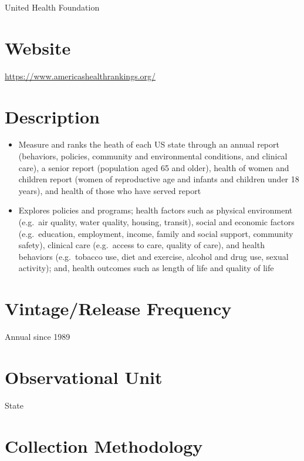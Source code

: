 \documentclass[
]{book}
\providecommand{\tightlist}{%
  \setlength{\itemsep}{0pt}\setlength{\parskip}{0pt}}
\begin{document}
United Health Foundation

\hypertarget{website-2}{%
\section{Website}\label{website-2}}

\url{https://www.americashealthrankings.org/}

\hypertarget{description-2}{%
\section{Description}\label{description-2}}

\begin{itemize}
\tightlist
\item
  Measure and ranks the heath of each US state through an annual report (behaviors, policies, community and environmental conditions, and clinical care), a senior report (population aged 65 and older), health of women and children report (women of reproductive age and infants and children under 18 years), and health of those who have served report
\item
  Explores policies and programs; health factors such as physical environment (e.g.~air quality, water quality, housing, transit), social and economic factors (e.g.~education, employment, income, family and social support, community safety), clinical care (e.g.~access to care, quality of care), and health behaviors (e.g.~tobacco use, diet and exercise, alcohol and drug use, sexual activity); and, health outcomes such as length of life and quality of life
\end{itemize}

\hypertarget{vintagerelease-frequency-2}{%
\section{Vintage/Release Frequency}\label{vintagerelease-frequency-2}}

Annual since 1989

\hypertarget{observational-unit-2}{%
\section{Observational Unit}\label{observational-unit-2}}

State

\hypertarget{collection-methodology-2}{%
\section{Collection Methodology}\label{collection-methodology-2}}
\end{document}
